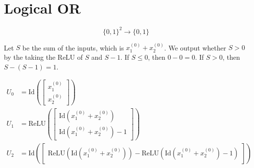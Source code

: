 \documentclass{article}
\newcommand{\relu}{\mathrm{ReLU}}
\newcommand{\id}{\mathrm{Id}}
\newcommand{\DrawNeuron}[5]{%
  \node[neuron] (#1) at #2 {};
  \node[vect]   at ($(#1.center)+(-0.5,0)$) {#4};
  \draw         ($(#1.center)+(0.2,1.2cm)$)--($(#1.center)+(0.2,-1.2cm)$);
  \node[actlabel]at ($(#1.center)+(0.9,0)$) {#5};
  \node[above=0pt of #1] {#3};
}
\begin{document}
\begin{center}
\end{center}

\section{Logical OR}

\[
  \{0,1\}^2 \to \{0,1\}
\]

Let $S$ be the sum of the inputs, which is $x^{(0)}_1 + x^{(0)}_2$.
We output whether $S>0$ by the taking the ReLU
of $S$ and $S-1$. If $S\le 0$, then $0-0=0$. If $S>0$, then $S-(S-1)=1$.

\begin{align*}
  U_0 &= \id\left(
    \begin{bmatrix}
      x^{(0)}_{1} \\
      x^{(0)}_{2}
  \end{bmatrix}\right) \\
  U_1 &= \relu\left(
    \begin{bmatrix}
      \id\left( x^{(0)}_{1} + x^{(0)}_{2} \right) \\
      \id\left( x^{(0)}_{1} + x^{(0)}_{2} \right) - 1
  \end{bmatrix}\right) \\
  U_2 &= \id\left(
    \begin{bmatrix}
      \relu\left( \id\left( x^{(0)}_{1} + x^{(0)}_{2} \right) \right) - \relu\left( \id\left( x^{(0)}_{1} + x^{(0)}_{2} \right) - 1 \right)
    \end{bmatrix}
  \right)
\end{align*}
\end{document}
